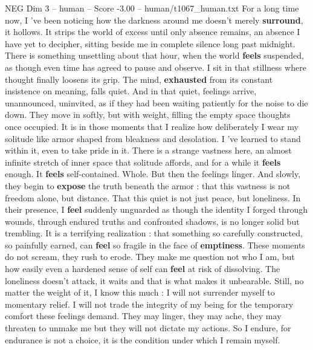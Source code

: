 \begin{textsample}{NEG Dim 3 – human – Score -3.00 – human/t1067\_human.txt}  \label{ex:f3_neg_033}
For a long time now, I ’ve been noticing how the darkness around me doesn't merely \textbf{surround}, it hollows.
It strips the world of excess until only absence remains, an absence I have yet to decipher, sitting beside me in complete silence long past midnight.
There is something unsettling about that hour, when the world \textbf{feels} suspended, as though even time has agreed to pause and observe.
I sit in that stillness where thought finally loosens its grip.
The mind, \textbf{exhausted} from its constant insistence on meaning, falls quiet.
And in that quiet, feelings arrive, unannounced, uninvited, as if they had been waiting patiently for the noise to die down.
They move in softly, but with weight, filling the empty space thoughts once occupied.
It is in those moments that I realize how deliberately I wear my solitude like armor shaped from bleakness and desolation.
I ’ve learned to stand within it, even to take pride in it.
There is a strange vastness here, an almost infinite stretch of inner space that solitude affords, and for a while it \textbf{feels} enough.
It \textbf{feels} self-contained.
Whole.
But then the feelings linger.
And slowly, they begin to \textbf{expose} the truth beneath the armor : that this vastness is not freedom alone, but distance.
That this quiet is not just peace, but loneliness.
In their presence, I \textbf{feel} suddenly unguarded as though the identity I forged through wounds, through endured truths and confronted shadows, is no longer solid but trembling.
It is a terrifying realization : that something so carefully constructed, so painfully earned, can \textbf{feel} so fragile in the face of \textbf{emptiness}.
These moments do not scream, they rush to erode.
They make me question not who I am, but how easily even a hardened sense of self can \textbf{feel} at risk of dissolving.
The loneliness doesn't attack, it waits and that is what makes it unbearable.
Still, no matter the weight of it, I know this much : I will not surrender myself to momentary relief.
I will not trade the integrity of my being for the temporary comfort these feelings demand.
They may linger, they may ache, they may threaten to unmake me but they will not dictate my actions.
So I endure, for endurance is not a choice, it is the condition under which I remain myself.

\end{textsample}
